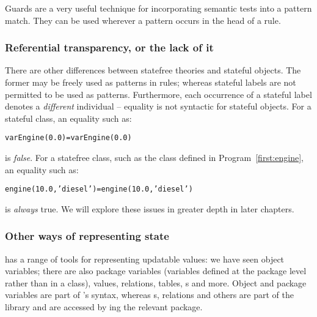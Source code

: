 Guards are a very useful technique for incorporating semantic tests into a pattern match. They can be used wherever a pattern occurs in the head of a rule.

\subsubsection{Referential transparency, or the lack of it}
There are other differences between statefree theories and stateful objects. The former may be freely used as patterns in rules; whereas stateful labels are not permitted to be used as patterns. Furthermore, each occurrence of a stateful label denotes a \emph{different} individual -- equality is not syntactic for stateful objects. For a stateful class, an equality such as:
\begin{alltt}
varEngine(0.0)=varEngine(0.0)
\end{alltt}
is \emph{false}. For a statefree class, such as the  class defined in Program~\vref{first:engine}, an equality such as:
\begin{alltt}
engine(10.0,'diesel') = engine(10.0,'diesel')
\end{alltt}
is \emph{always} true. We will explore these issues in greater depth in later chapters.

\subsubsection{Other ways of representing state}
\go has a range of tools for representing updatable values: we have seen object variables; there are also package variables (variables defined at the package level rather than in a class),  values,  relations,  tables, s and more. Object and package variables are part of \go's syntax, whereas s,  relations and others are part of the \go library and are accessed by ing the relevant package.


